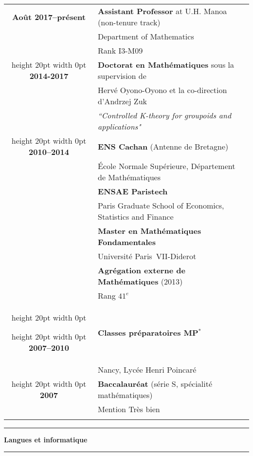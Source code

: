 \documentclass[a4paper,11pt]{article}
\newcommand\espace{\vrule height 20pt width 0pt}
\newcommand{\titre}[1]{%
	\begin{center}
	\bigskip
	\rule{\textwidth}{1pt}
	\par\vspace{0.1cm}
        \textbf{\large #1}
	\par\rule{\textwidth}{1pt}
	\end{center}
	\bigskip
	}
\begin{document}
\begin{tabular}{cp{}}

\textbf{Ao\^{u}t 2017--pr\'{e}sent} &  \textbf{Assistant Professor} at U.H. Manoa (non-tenure track)  \\
						& Department of Mathematics\\
						&  Rank I3-M09 \\
						\espace
\textbf{2014-2017} &  \textbf{Doctorat en Math\'ematiques} sous la supervision de \\
						& Hervé Oyono-Oyono et la co-direction d'Andrzej Zuk \\	
						& \textit{``Controlled K-theory for groupoids and applications"} \\
\espace
\textbf{2010--2014} &  \textbf{ENS Cachan} (Antenne de Bretagne) \\
				    & 	\'Ecole Normale Supérieure, D\'epartement de Math\'ematiques \\
                              & \textbf{ENSAE Paristech}\\
				&	Paris Graduate School of Economics, Statistics and Finance\\
                                   & \textbf{Master en Math\'ematiques Fondamentales}\\  & Universit\'e Paris~VII-Diderot \\
                                   & \textbf{Agrégation externe de Mathématiques} (2013) \\ 
							& Rang $41^e$ \\
\espace

\espace
\textbf{2007--2010} &\textbf{Classes préparatoires MP$^*$ } \\
					& Nancy, Lycée Henri Poincaré\\

\espace
\textbf{2007} & \textbf{Baccalauréat} (série S, sp\'ecialit\'e math\'ematiques) \\		& Mention Tr\`es bien \\
 \\

\end{tabular}

\newpage
\titre{Langues et informatique}
\end{document}
